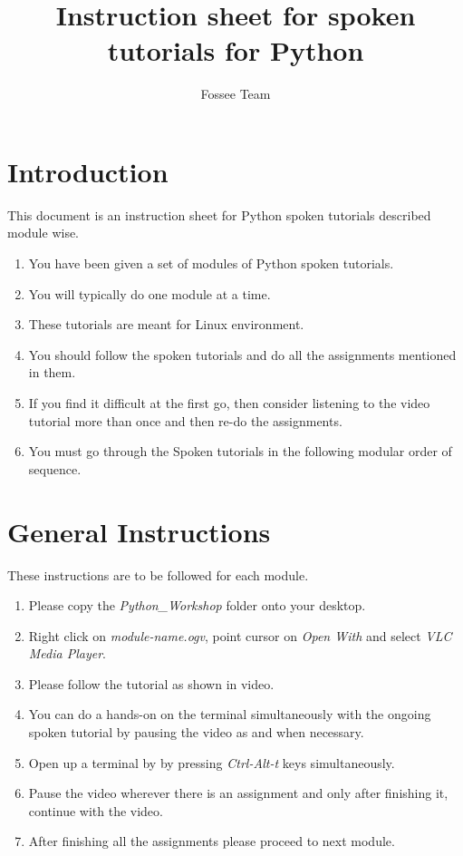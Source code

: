 \documentclass[11pt,twocolumn]{article}
\begin{document}
\title{Instruction sheet for spoken tutorials for Python}
\author{Fossee Team}
\maketitle
\section*{Introduction }
{This document is an instruction sheet for Python spoken tutorials described module wise.}
\setlength{\columnsep}{15pt }
\begin{enumerate}
  \item You have been given a set of modules of Python spoken tutorials.
  \item You will typically do one module at a time.
  \item These tutorials are meant for Linux environment.
  \item You should follow the spoken tutorials and do all the assignments mentioned in them.
   \item If you find it difficult at the first go, then consider listening to the video tutorial more than once and then re-do the assignments.
   \item You must go through the Spoken tutorials in the following modular order of sequence. 
  

\end{enumerate}

\section*{General Instructions}
{These instructions are to be followed for each module.}
\setlength{\columnsep}{15pt }
\begin{enumerate}
	  
	
	\item Please copy the \emph{Python\_Workshop} folder onto your desktop.
     \item Right click on \emph{module-name.ogv}, point cursor on \emph{Open With} and select \emph{VLC Media Player}.
  \item Please follow the tutorial as shown in video.
  \item You can do a hands-on on the terminal simultaneously with the ongoing spoken tutorial by pausing the video as and when necessary.
  \item Open up a terminal by by pressing \emph{Ctrl-Alt-t} keys simultaneously.
  \item Pause the video wherever there is an assignment and only after finishing it, continue with the video.
  \item After finishing all the assignments please proceed to next module. 

\end{enumerate}
\end{document}
